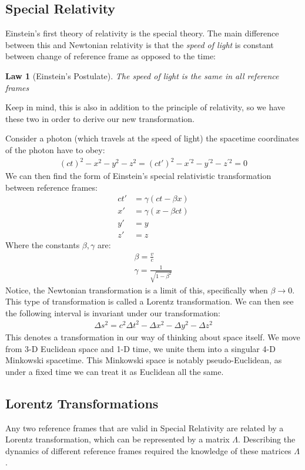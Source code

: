 \documentclass[12pt]{article}
\newtheorem{law}{Law}
\begin{document}
\subsection{Special Relativity}
Einstein's first theory of relativity is the special theory. The main difference between this and Newtonian relativity is that the \emph{speed of light} is constant between change of reference frame as opposed to the time:
\begin{law}[Einstein's Postulate]
  The speed of light is the same in all reference frames
\end{law}
Keep in mind, this is also in addition to the principle of relativity, so we have these two in order to derive our new transformation.

Consider a photon (which travels at the speed of light) the spacetime coordinates of the photon have to obey:
\begin{gather*}
  (ct)^2-x^2-y^2-z^2=(ct')^2-x^{\prime2}-y^{\prime2}-z^{\prime2}=0
\end{gather*}
We can then find the form of Einstein's special relativistic transformation between reference frames:
\begin{align*}
  ct'&=\gamma(ct-\beta x)\\
  x'&=\gamma(x-\beta ct)\\
  y'&=y\\
  z'&=z
\end{align*}
Where the constants $\beta,\gamma$ are:
\begin{gather*}
  \beta=\frac{v}{c}\\
  \gamma=\frac{1}{\sqrt{1-\beta^2}}
\end{gather*}
Notice, the Newtonian transformation is a limit of this, specifically when $\beta\to0$. This type of transformation is called a Lorentz transformation. We can then see the following interval is invariant under our transformation:
\begin{gather*}
  \Delta{s}^2=c^2\Delta{t}^2-\Delta{x}^2-\Delta{y}^2-\Delta{z}^2
\end{gather*}
This denotes a transformation in our way of thinking about space itself. We move from 3-D Euclidean space and 1-D time, we unite them into a singular 4-D Minkowski spacetime. This Minkowski space is notably pseudo-Euclidean, as under a fixed time we can treat it as Euclidean all the same.

\subsection{Lorentz Transformations}
Any two reference frames that are valid in Special Relativity are related by a Lorentz transformation, which can be represented by a matrix $\Lambda$. Describing the dynamics of different reference frames required the knowledge of these matrices $\Lambda$.
\end{document}
